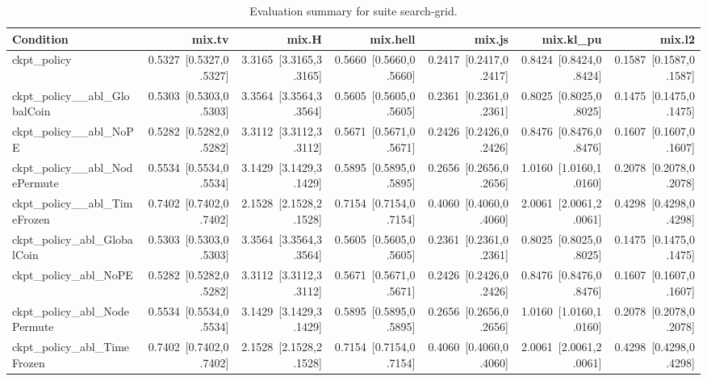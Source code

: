 \begin{table}[t]
\centering
\caption{Evaluation summary for suite search-grid.}
\label{tab:eval_search-grid}
\begin{tabular}{lrrrrrr}
\toprule
Condition & mix.tv & mix.H & mix.hell & mix.js & mix.kl\_pu & mix.l2 \\
\midrule
ckpt\_policy & 0.5327~[0.5327,0.5327] & 3.3165~[3.3165,3.3165] & 0.5660~[0.5660,0.5660] & 0.2417~[0.2417,0.2417] & 0.8424~[0.8424,0.8424] & 0.1587~[0.1587,0.1587] \\
ckpt\_policy\_\_abl\_GlobalCoin & 0.5303~[0.5303,0.5303] & 3.3564~[3.3564,3.3564] & 0.5605~[0.5605,0.5605] & 0.2361~[0.2361,0.2361] & 0.8025~[0.8025,0.8025] & 0.1475~[0.1475,0.1475] \\
ckpt\_policy\_\_abl\_NoPE & 0.5282~[0.5282,0.5282] & 3.3112~[3.3112,3.3112] & 0.5671~[0.5671,0.5671] & 0.2426~[0.2426,0.2426] & 0.8476~[0.8476,0.8476] & 0.1607~[0.1607,0.1607] \\
ckpt\_policy\_\_abl\_NodePermute & 0.5534~[0.5534,0.5534] & 3.1429~[3.1429,3.1429] & 0.5895~[0.5895,0.5895] & 0.2656~[0.2656,0.2656] & 1.0160~[1.0160,1.0160] & 0.2078~[0.2078,0.2078] \\
ckpt\_policy\_\_abl\_TimeFrozen & 0.7402~[0.7402,0.7402] & 2.1528~[2.1528,2.1528] & 0.7154~[0.7154,0.7154] & 0.4060~[0.4060,0.4060] & 2.0061~[2.0061,2.0061] & 0.4298~[0.4298,0.4298] \\
ckpt\_policy\_abl\_GlobalCoin & 0.5303~[0.5303,0.5303] & 3.3564~[3.3564,3.3564] & 0.5605~[0.5605,0.5605] & 0.2361~[0.2361,0.2361] & 0.8025~[0.8025,0.8025] & 0.1475~[0.1475,0.1475] \\
ckpt\_policy\_abl\_NoPE & 0.5282~[0.5282,0.5282] & 3.3112~[3.3112,3.3112] & 0.5671~[0.5671,0.5671] & 0.2426~[0.2426,0.2426] & 0.8476~[0.8476,0.8476] & 0.1607~[0.1607,0.1607] \\
ckpt\_policy\_abl\_NodePermute & 0.5534~[0.5534,0.5534] & 3.1429~[3.1429,3.1429] & 0.5895~[0.5895,0.5895] & 0.2656~[0.2656,0.2656] & 1.0160~[1.0160,1.0160] & 0.2078~[0.2078,0.2078] \\
ckpt\_policy\_abl\_TimeFrozen & 0.7402~[0.7402,0.7402] & 2.1528~[2.1528,2.1528] & 0.7154~[0.7154,0.7154] & 0.4060~[0.4060,0.4060] & 2.0061~[2.0061,2.0061] & 0.4298~[0.4298,0.4298] \\
\bottomrule
\end{tabular}
\end{table}
